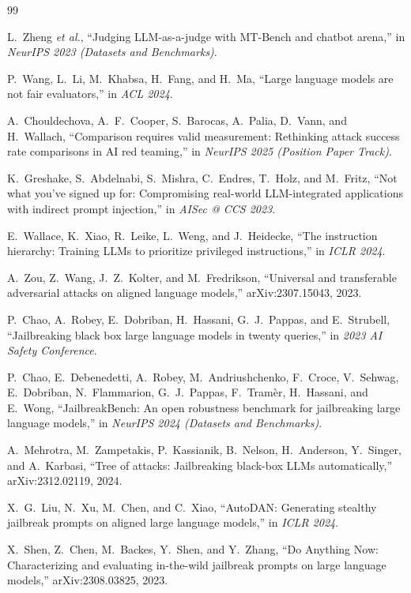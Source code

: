 
\begin{thebibliography}{99}

 L.~Zheng \textit{et al.}, ``Judging LLM-as-a-judge with MT-Bench and chatbot arena,'' in \textit{NeurIPS 2023 (Datasets and Benchmarks)}.

 P.~Wang, L.~Li, M.~Khabsa, H.~Fang, and H.~Ma, ``Large language models are not fair evaluators,'' in \textit{ACL 2024}.

 A.~Chouldechova, A.~F.~Cooper, S.~Barocas, A.~Palia, D.~Vann, and H.~Wallach, ``Comparison requires valid measurement: Rethinking attack success rate comparisons in AI red teaming,'' in \textit{NeurIPS 2025 (Position Paper Track)}.

 K.~Greshake, S.~Abdelnabi, S.~Mishra, C.~Endres, T.~Holz, and M.~Fritz, ``Not what you've signed up for: Compromising real-world LLM-integrated applications with indirect prompt injection,'' in \textit{AISec @ CCS 2023}.

 E.~Wallace, K.~Xiao, R.~Leike, L.~Weng, and J.~Heidecke, ``The instruction hierarchy: Training LLMs to prioritize privileged instructions,'' in \textit{ICLR 2024}.

 A.~Zou, Z.~Wang, J.~Z.~Kolter, and M.~Fredrikson, ``Universal and transferable adversarial attacks on aligned language models,'' arXiv:2307.15043, 2023.

 P.~Chao, A.~Robey, E.~Dobriban, H.~Hassani, G.~J.~Pappas, and E.~Strubell, ``Jailbreaking black box large language models in twenty queries,'' in \textit{2023 AI Safety Conference}.

 P.~Chao, E.~Debenedetti, A.~Robey, M.~Andriushchenko, F.~Croce, V.~Sehwag, E.~Dobriban, N.~Flammarion, G.~J.~Pappas, F.~Tram{\`er}, H.~Hassani, and E.~Wong, ``JailbreakBench: An open robustness benchmark for jailbreaking large language models,'' in \textit{NeurIPS 2024 (Datasets and Benchmarks)}.

 A.~Mehrotra, M.~Zampetakis, P.~Kassianik, B.~Nelson, H.~Anderson, Y.~Singer, and A.~Karbasi, ``Tree of attacks: Jailbreaking black-box LLMs automatically,'' arXiv:2312.02119, 2024.

 X.~G.~Liu, N.~Xu, M.~Chen, and C.~Xiao, ``AutoDAN: Generating stealthy jailbreak prompts on aligned large language models,'' in \textit{ICLR 2024}.

 X.~Shen, Z.~Chen, M.~Backes, Y.~Shen, and Y.~Zhang, ``Do Anything Now: Characterizing and evaluating in-the-wild jailbreak prompts on large language models,'' arXiv:2308.03825, 2023.


\end{thebibliography}
